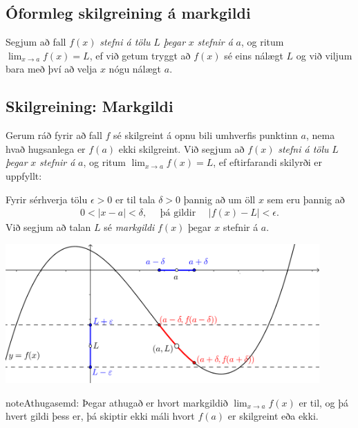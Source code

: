 \documentclass[b5paper,11pt,icelandic]{sphinxmanual}
\begin{document}
\subsection{Óformleg skilgreining á markgildi}
\label{kafli02:index-0}\label{kafli02:oformleg-skilgreining-a-markgildi}
Segjum að fall \(f(x)\) \emph{stefni á tölu} \(L\) \emph{þegar} \(x\)
\emph{stefnir á} \(a\), og ritum \(\lim_{x\rightarrow a} f(x)=L\), ef
við getum tryggt að \(f(x)\) sé eins nálægt \(L\) og við
viljum bara með því að velja \(x\) nógu nálægt \(a\).


\subsection{Skilgreining: Markgildi}
\label{kafli02:skilgreining-markgildi}
Gerum ráð fyrir að fall \(f\) sé skilgreint á opnu bili umhverfis
punktinn \(a\), nema hvað hugsanlega er \(f(a)\) ekki
skilgreint. Við segjum að \(f(x)\) \emph{stefni á tölu} \(L\) \emph{þegar}
\(x\) \emph{stefnir á} \(a\), og ritum
\(\lim_{x\rightarrow a} f(x)=L\), ef eftirfarandi skilyrði er
uppfyllt:

Fyrir sérhverja tölu \(\epsilon>0\) er til tala \(\delta>0\)
þannig að um öll \(x\) sem eru þannig að
\begin{equation*}
\begin{split}0 < |x-a| < \delta,\quad \text{ þá gildir } \quad |f(x)-L| <\epsilon.\end{split}
\end{equation*}
Við segjum að talan \(L\) sé \textit{markgildi} \(f(x)\) þegar
\(x\) stefnir á \(a\).


\begin{center}
\includegraphics[width=12cm,keepaspectratio=true]{01_markgildi.png}
\end{center}


\begin{notice}{note}{Athugasemd:}
Þegar athugað er hvort markgildið \(\lim_{x\rightarrow a} f(x)\) er
til, og þá hvert gildi þess er, þá skiptir ekki máli hvort \(f(a)\) er
skilgreint eða ekki.
\end{notice}
\end{document}
